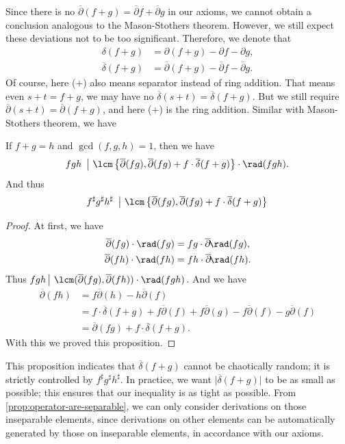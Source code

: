 Since there is no $\overline{\partial}(f + g) = \overline{\partial}f + \overline{\partial}g$ in our axioms, we cannot obtain a conclusion analogous to the Mason-Stothers theorem. However, we still expect these deviations not to be too significant.
Therefore, we denote that
\begin{align*}
	\delta(f + g) &= \partial(f + g) - \partial f - \partial g,\\
	\overline{\delta}(f + g) &= \overline{\partial}(f + g) - \overline{\partial}f - \overline{\partial}g.
\end{align*}
Of course, here ($+$) also means separator instead of ring addition. That means even $s + t  = f + g$, we may have no $\overline{\delta}(s + t) = \overline{\delta}(f + g)$. But we still require $\overline{\partial}(s + t) = \overline{\partial}(f + g)$, and here ($+$) is the ring addition.
Similar with Mason-Stothers theorem, we have
\begin{proposition}\label{prop:fgh-mid-lcm-rad}
	If $f + g = h$ and $\gcd(f, g, h) = 1$, then we have
	\[ fgh\ \left\vert\ \lcm\left\{\overline{\partial}(fg), \overline{\partial}(fg) + f\cdot\overline{\delta}(f + g)\right\}\cdot\rad(fgh). \right. \]
	And thus
	\[ f^{\sharp}g^{\sharp}h^{\sharp}\ \left\vert\ \lcm\left\{\overline{\partial}(fg), \overline{\partial}(fg) + f\cdot\overline{\delta}(f + g)\right\} \right. \]
\end{proposition}
\begin{proof}
	At first, we have
	\begin{align*}
		\overline{\partial}(fg) \cdot \rad(fg) &= fg \cdot \overline{\partial}\!\rad(fg), \\
		\overline{\partial}(fh) \cdot \rad(fh) &= fh \cdot \overline{\partial}\!\rad(fh).
	\end{align*}
	Thus $fgh \left\vert\ \lcm(\overline{\partial}(fg), \overline{\partial}(fh))\cdot\rad(fgh)\right.$. And we have
	\begin{align*}
		\overline{\partial}(fh) &= f\overline{\partial}(h) - h\overline{\partial}(f) \\
		&= f\cdot\overline{\delta}(f + g) + f\overline{\partial}(f) + f\overline{\partial}(g) - f\overline{\partial}(f) - g\overline{\partial}(f) \\
		&= \overline{\partial}(fg) + f\cdot\overline{\delta}(f + g).
	\end{align*}
	With this we proved this proposition.
\end{proof}
This proposition indicates that $\overline{\delta}(f + g)$ cannot be chaotically random; it is strictly controlled by $f^{\sharp}g^{\sharp}h^{\sharp}$.
In practice, we want $\vert\overline{\delta}(f + g)\vert$ to be as small as possible; this ensures that our inequality is as tight as possible.
From \cref{prop:operator-are-separable}, we can only consider derivations on those inseparable elements, since derivations on other elements can be automatically generated by those on inseparable elements, in accordance with our axioms.

